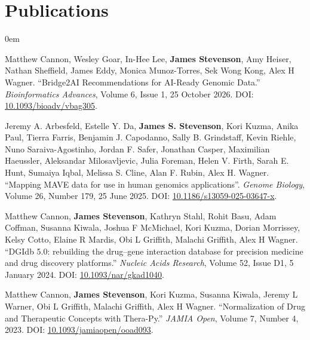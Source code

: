 \documentclass[letterpaper,11pt]{article}
\begin{document}
\section{Publications}
\begin{addmargin}[1em]{0em}

    Matthew Cannon, Wesley Goar, In-Hee Lee, \textbf{James Stevenson}, Amy Heiser, Nathan Sheffield, James Eddy, Monica Munoz-Torres, Sek Wong Kong, Alex H Wagner. ``Bridge2AI Recommendations for AI-Ready Genomic Data.'' \emph{Bioinformatics Advances}, Volume 6, Issue 1, 25 October 2026. DOI: \href{https://doi.org/10.1093/bioadv/vbag305}{10.1093/bioadv/vbag305}.

\vspace{8pt}\par


Jeremy A. Arbesfeld, Estelle Y. Da, \textbf{James S. Stevenson}, Kori Kuzma, Anika Paul, Tierra Farris, Benjamin J. Capodanno, Sally B. Grindstaff, Kevin Riehle, Nuno Saraiva-Agostinho, Jordan F. Safer, Jonathan Casper, Maximilian Haeussler, Aleksandar Milosavljevic, Julia Foreman, Helen V. Firth, Sarah E. Hunt, Sumaiya Iqbal, Melissa S. Cline, Alan F. Rubin, Alex H. Wagner.
``Mapping MAVE data for use in human genomics applications''. \emph{Genome Biology}, Volume 26, Number 179, 25 June 2025. DOI: \href{https://doi.org/10.1186/s13059-025-03647-x}{10.1186/s13059-025-03647-x}.

\vspace{8pt}\par

Matthew Cannon, \textbf{James Stevenson}, Kathryn Stahl, Rohit Basu, Adam Coffman, Susanna Kiwala, Joshua F McMichael, Kori Kuzma, Dorian Morrissey, Kelsy Cotto, Elaine R Mardis, Obi L Griffith, Malachi Griffith, Alex H Wagner.
``DGIdb 5.0: rebuilding the drug–gene interaction database for precision medicine and drug discovery platforms.'' \emph{Nucleic Acids Research}, Volume 52, Issue D1, 5 January 2024. DOI: \href{https://doi.org/10.1093/nar/gkad1040}{10.1093/nar/gkad1040}.

\vspace{8pt}\par

Matthew Cannon, \textbf{James Stevenson}, Kori Kuzma, Susanna Kiwala, Jeremy L Warner, Obi L Griffith, Malachi Griffith, Alex H Wagner.
``Normalization of Drug and Therapeutic Concepts with Thera-Py.'' \emph{JAMIA Open}, Volume 7, Number 4, 2023. DOI: \href{https://doi.org/10.1093/jamiaopen/ooad093}{10.1093/jamiaopen/ooad093}.

\end{addmargin}
\end{document}

